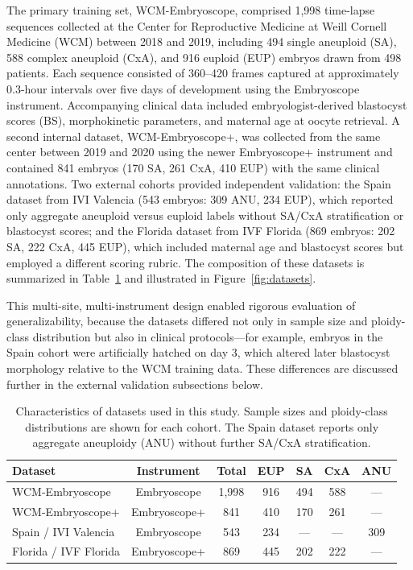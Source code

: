 \documentclass[11pt]{article}
\begin{document}
The primary training set, WCM-Embryoscope, comprised 1{,}998 time-lapse sequences collected at the Center for Reproductive Medicine at Weill Cornell Medicine (WCM) between 2018 and 2019, including 494 single aneuploid (SA), 588 complex aneuploid (CxA), and 916 euploid (EUP) embryos drawn from 498 patients. Each sequence consisted of 360--420 frames captured at approximately 0.3-hour intervals over five days of development using the Embryoscope instrument. Accompanying clinical data included embryologist-derived blastocyst scores (BS), morphokinetic parameters, and maternal age at oocyte retrieval. A second internal dataset, WCM-Embryoscope+, was collected from the same center between 2019 and 2020 using the newer Embryoscope+ instrument and contained 841 embryos (170 SA, 261 CxA, 410 EUP) with the same clinical annotations. Two external cohorts provided independent validation: the Spain dataset from IVI Valencia (543 embryos: 309 ANU, 234 EUP), which reported only aggregate aneuploid versus euploid labels without SA/CxA stratification or blastocyst scores; and the Florida dataset from IVF Florida (869 embryos: 202 SA, 222 CxA, 445 EUP), which included maternal age and blastocyst scores but employed a different scoring rubric. The composition of these datasets is summarized in Table~\ref{tab:datasets} and illustrated in Figure~\ref{fig:datasets}.

This multi-site, multi-instrument design enabled rigorous evaluation of generalizability, because the datasets differed not only in sample size and ploidy-class distribution but also in clinical protocols---for example, embryos in the Spain cohort were artificially hatched on day 3, which altered later blastocyst morphology relative to the WCM training data. These differences are discussed further in the external validation subsections below.

\begin{table}[htbp]
\centering
\caption{Characteristics of datasets used in this study. Sample sizes and ploidy-class distributions are shown for each cohort. The Spain dataset reports only aggregate aneuploidy (ANU) without further SA/CxA stratification.}
\label{tab:datasets}
\begin{tabular}{lcccccc}
\toprule
Dataset & Instrument & Total & EUP & SA & CxA & ANU \\
\midrule
WCM-Embryoscope & Embryoscope & 1{,}998 & 916 & 494 & 588 & --- \\
WCM-Embryoscope+ & Embryoscope+ & 841 & 410 & 170 & 261 & --- \\
Spain / IVI Valencia & Embryoscope & 543 & 234 & --- & --- & 309 \\
Florida / IVF Florida & Embryoscope+ & 869 & 445 & 202 & 222 & --- \\
\bottomrule
\end{tabular}
\end{table}
\end{document}
